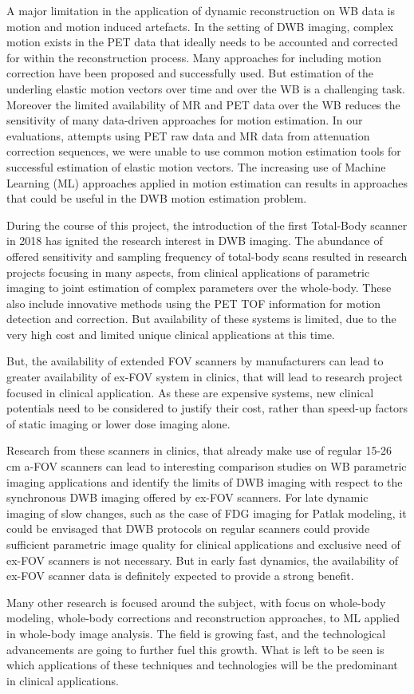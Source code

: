 A major limitation in the application of dynamic reconstruction on WB data is motion and motion induced artefacts. 
In the setting of DWB imaging, complex motion exists in the PET data that ideally needs to be accounted and corrected for within the reconstruction process. Many approaches for including motion correction have been proposed and successfully used. But estimation of the underling elastic motion vectors over time and over the WB is a challenging task. Moreover the limited availability of MR and PET data over the WB reduces the sensitivity of many data-driven approaches for motion estimation. In our evaluations, attempts using PET raw data and MR data from attenuation correction sequences, we were unable to use common motion estimation tools for successful estimation of elastic motion vectors.
The increasing use of Machine Learning (ML) approaches applied in motion estimation can results in approaches that could be useful in the DWB motion estimation problem.


During the course of this project, the introduction of the first Total-Body scanner in 2018 has ignited the research interest in DWB imaging. The abundance of offered sensitivity and sampling frequency of total-body scans resulted in research projects focusing in many aspects, from clinical applications of parametric imaging to joint estimation of complex parameters over the whole-body. These also include innovative methods using the PET TOF information for motion detection and correction. 
But availability of these systems is limited, due to the very high cost and limited unique clinical applications at this time.

But, the availability of extended FOV scanners by manufacturers can lead to greater availability of ex-FOV system in clinics, that will lead to research project focused in clinical application. As these are expensive systems, new clinical potentials need to be considered to justify their cost, rather than speed-up factors of static imaging or lower dose imaging alone. 

Research from these scanners in clinics, that already make use of regular 15-26 cm a-FOV scanners can lead to interesting comparison studies on WB parametric imaging applications and identify the limits of DWB imaging with respect to the synchronous DWB imaging offered by ex-FOV scanners. 
For late dynamic imaging of slow changes, such as the case of FDG imaging for Patlak modeling, it could be envisaged that DWB protocols on regular scanners could provide sufficient parametric image quality for clinical applications and exclusive need of ex-FOV scanners is not necessary. But in early fast dynamics, the availability of ex-FOV scanner data is definitely expected to provide a strong benefit.

Many other research is focused around the subject, with focus on whole-body modeling, whole-body corrections and reconstruction approaches, to ML applied in whole-body image analysis. The field is growing fast, and the technological advancements are going to further fuel this growth. What is left to be seen is which applications of these techniques and technologies will be the predominant in clinical applications.